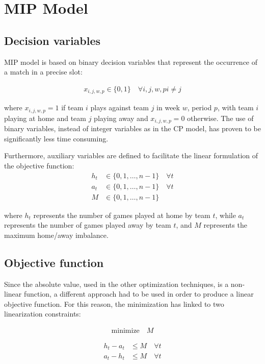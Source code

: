 \documentclass{article}
\begin{document}
\section{MIP Model}

\subsection{Decision variables}

MIP model is based on binary decision variables that represent the occurrence of a match in a precise slot:

\begin{align}
x_{i,j,w,p} \in \{0,1\} \quad \forall i,j, w, p i \neq j
\end{align}

where $x_{i,j,w,p} = 1$ if team $i$ plays against team $j$ in week $w$, period $p$, with team $i$ playing at home and team $j$ playing away and $x_{i,j,w,p} = 0$ otherwise. The use of binary variables, instead of integer variables as in the CP model, has proven to be significantly less time consuming.

Furthermore, auxiliary variables are defined to facilitate the linear formulation of the objective function:
\begin{align}
h_t &\in \{0, 1, \ldots, n-1\} \quad \forall t \\
a_t &\in \{0, 1, \ldots, n-1\} \quad \forall t \\
M &\in \{0, 1, \ldots, n-1\}
\end{align}

where $h_t$ represents the number of games played at home by team $t$, while $a_t$ represents the number of games played away by team $t$, and $M$ represents the maximum home/away imbalance.


\subsection{Objective function}
Since the absolute value, used in the other optimization techniques, is a non-linear function, a different approach had to be used in order to produce a linear objective function. 
For this reason, the minimization has linked to two linearization constraints:

\begin{align}
\text{minimize} \quad M
\end{align}

\begin{align}
h_t - a_t &\leq M \quad \forall t \\
a_t - h_t &\leq M \quad \forall t
\end{align}
\end{document}
